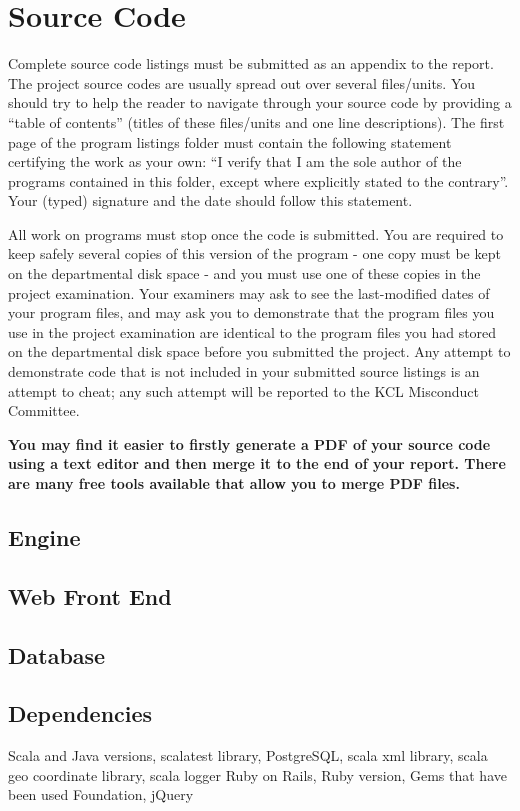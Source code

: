 \chapter{Source Code}
Complete source code listings must be submitted as an appendix to the report. The project source codes are usually spread out over several files/units. You should try to help the reader to navigate through your source code by providing a ``table of contents'' (titles of these files/units and one line descriptions). The first page of the program listings folder must contain the following statement certifying the work as your own: ``I verify that I am the sole author of the programs contained in this folder, except where explicitly stated to the contrary''. Your (typed) signature and the date should follow this statement.

All work on programs must stop once the code is submitted. You are required to keep safely several copies of this version of the program - one copy must be kept on the departmental disk space - and you must use one of these copies in the project examination. Your examiners may ask to see the last-modified dates of your program files, and may ask you to demonstrate that the program files you use in the project examination are identical to the program files you had stored on the departmental disk space before you submitted the project. Any attempt to demonstrate code that is not included in your submitted source listings is an attempt to cheat; any such attempt will be reported to the KCL Misconduct Committee.

\textbf{You may find it easier to firstly generate a PDF of your source code using a text editor and then merge it to the end of your report. There are many free tools available that allow you to merge PDF files.}


\section{Engine}
\section{Web Front End}
\section{Database}
\section{Dependencies}
Scala and Java versions, scalatest library, PostgreSQL, scala xml library, scala geo coordinate library, scala logger
Ruby on Rails, Ruby version, Gems that have been used
Foundation, jQuery